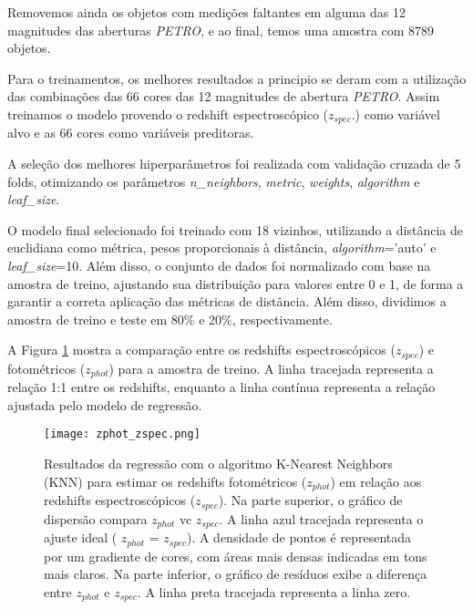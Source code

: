 \vspace{\baselineskip}

Removemos ainda os objetos com medições faltantes em alguma das 12 magnitudes das aberturas \textit{PETRO}, e ao final, temos uma amostra com 8789 objetos.

\vspace{\baselineskip}

Para o treinamentos, os melhores resultados a principio se deram com a utilização das combinações das 66 cores das 12 magnitudes de abertura \textit{PETRO}. Assim treinamos o modelo provendo o redshift espectroscópico (\textit{$z_{spec}$}.) como variável alvo e as 66 cores como variáveis preditoras.

\vspace{\baselineskip}

A seleção dos melhores hiperparâmetros foi realizada com validação cruzada de 5 folds, otimizando os parâmetros \textit{n\_neighbors}, \textit{metric}, \textit{weights}, \textit{algorithm} e \textit{leaf\_size}.

\vspace{\baselineskip}

O modelo final selecionado foi treinado com 18 vizinhos, utilizando a distância de euclidiana como métrica, pesos proporcionais à distância, \textit{algorithm}='auto' e \textit{leaf\_size}=10. Além disso, o conjunto de dados foi normalizado com base na amostra de treino, ajustando sua distribuição para valores entre 0 e 1, de forma a garantir a correta aplicação das métricas de distância. Além disso, dividimos a amostra de treino e teste em 80\% e 20\%, respectivamente.

\vspace{\baselineskip}

A Figura \ref{zphot_zspec} mostra a comparação entre os redshifts espectroscópicos ($\textit{$z_{spec}$}$) e fotométricos (\textit{$z_{phot}$}) para a amostra de treino. A linha tracejada representa a relação 1:1 entre os redshifts, enquanto a linha contínua representa a relação ajustada pelo modelo de regressão.

\begin{figure}[!ht]
    \centering
    \texttt{[image: zphot\_zspec.png]}
    \caption[]{Resultados da regressão com o algoritmo K-Nearest Neighbors (KNN) para estimar os redshifts fotométricos (\textit{$z_{phot}$}) em relação aos redshifts espectroscópicos (\textit{$z_{spec}$}). Na parte superior, o gráfico de dispersão compara \textit{$z_{phot}$} vc \textit{$z_{spec}$}. A linha azul tracejada representa o ajuste ideal ( \textit{$z_{phot}$} = \textit{$z_{spec}$}). A densidade de pontos é representada por um gradiente de cores, com áreas mais densas indicadas em tons mais claros. Na parte inferior, o gráfico de resíduos exibe a diferença entre \textit{$z_{phot}$} e \textit{$z_{spec}$}. A linha preta tracejada representa a linha zero.}
    \label{zphot_zspec}
\end{figure}

